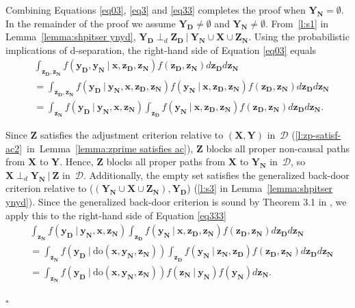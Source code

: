 \documentclass[11pt,a4paper]{article}
\newcommand{\ddo}{\textrm{do}}
\newcommand\given[1][]{\:#1\vert\:}
\newcommand{\dsepp}{\perp_{d}}
\newenvironment{proofof}[1][]{\begin{trivlist}
   \item[\hskip \labelsep {\bfseries Proof of #1.}]}{\hfill{}$\square$\end{trivlist}}
\newcommand{\g}[1][G]{\mathcal{#1}}
\begin{document}
\begin{proofof}[Theorem~\ref{theorem:soundness ac}]
\noindent{}Combining Equations \eqref{eq03}, \eqref{eq3} and \eqref{eq33} completes the proof when $\mathbf{Y_N} = \emptyset$.
In the remainder of the proof we assume $\mathbf{Y_D} \neq \emptyset$ and $\mathbf{Y_N} \neq \emptyset$.
From~\ref{l:s1} in Lemma~\ref{lemma:shpitser ynyd}, $\mathbf{Y_D} \dsepp \mathbf{Z_D} \given \mathbf{Y_N} \cup \mathbf{X} \cup \mathbf{Z_N}$. Using the probabilistic implications of d-separation, the right-hand side of Equation \eqref{eq03} equals
\begin{align}
& \int_{\mathbf{z_D,z_N}} f( \mathbf{y_D,y_N} \given \mathbf{x,z_D,z_N})  f(\mathbf{z_D,z_N}) d\mathbf{z_D}d\mathbf{z_N} \nonumber \\
& =\int_{\mathbf{z_D,z_N}} f( \mathbf{y_D} \given \mathbf{y_N,x,z_D,z_N}) f(\mathbf{y_N} \given \mathbf{x,z_D,z_N}) f(\mathbf{z_D,z_N}) d\mathbf{z_D}d\mathbf{z_N} \nonumber \\
&= \int_{\mathbf{z_N}} f( \mathbf{y_D} \given \mathbf{y_N,x,z_N}) \int_{\mathbf{z_D}} f(\mathbf{y_N} \given \mathbf{x,z_D,z_N}) f(\mathbf{z_D,z_N}) d\mathbf{z_D}d\mathbf{z_N}. \label{eq333}
\end{align}

Since $\mathbf{Z}$ satisfies the adjustment criterion relative to $(\mathbf{X,Y})$ in~$\g[D]$ (\ref{l:zp-satisf-ac2}~in~Lemma~\ref{lemma:zprime satisfies ac}), $\mathbf{Z}$ blocks all proper non-causal paths from $\mathbf{X}$ to $\mathbf{Y}$. Hence, $\mathbf{Z}$ blocks all proper paths from $\mathbf{X}$ to $\mathbf{Y_N}$ in~$\g[D]$, so $\mathbf{X} \dsepp \mathbf{Y_N} \given \mathbf{Z}$ in~$\g[D]$. Additionally, the empty set satisfies the generalized back-door criterion relative to ($(\mathbf{Y_N} \cup \mathbf{X} \cup \mathbf{Z_N}),\mathbf{Y_D}$) (\ref{l:s3} in Lemma~\ref{lemma:shpitser ynyd}). 
Since the generalized back-door criterion is sound by Theorem 3.1 in \cite{maathuis2013generalized}, we apply this to the right-hand side of Equation \eqref{eq333}
\begin{align}
  & \int_{\mathbf{z_N}} f( \mathbf{y_D} \given \mathbf{y_N,x,z_N}) \int_{\mathbf{z_D}} f(\mathbf{y_N} \given \mathbf{x,z_D,z_N}) f(\mathbf{z_D,z_N})d\mathbf{z_D}d\mathbf{z_N}  \nonumber  \\
  &= \int_{\mathbf{z_N}} f( \mathbf{y_D} \given \ddo(\mathbf{x,y_N,z_N})) \int_{\mathbf{z_D}}  f(\mathbf{y_N} \given \mathbf{z_N,z_D}) f(\mathbf{z_D,z_N})d\mathbf{z_D}d\mathbf{z_N} \nonumber \\
  &= \int_{\mathbf{z_N}}  f( \mathbf{y_D} \given \ddo(\mathbf{x,y_N,z_N})) f(\mathbf{z_N} \given \mathbf{y_N}) f(\mathbf{y_N})d\mathbf{z_N}. \label{eq4}
\end{align}


\end{proofof}
\end{document}
